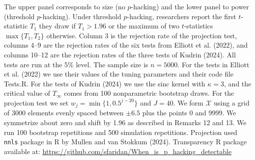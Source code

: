 \begin{table}[htbp]
\medskip
\begin{minipage}{\linewidth}
\footnotesize
The upper panel corresponds to size (no $p$-hacking) and the lower panel to power (threshold
$p$-hacking). Under threshold $p$-hacking, researchers report the first $t$-statistic $T_1$ they
draw if $T_1 > 1.96$ or the maximum of two $t$-statistics $\max\{T_1, T_2\}$ otherwise. Column 3 is
the rejection rate of the projection test, columns 4--9 are the rejection rates of the six tests
from Elliott et al. (2022), and columns 10--12 are the rejection rates of the three tests of Kudrin
(2024). All tests are run at the 5\% level. The sample size is $n = 5000$. For the tests in Elliott
et al. (2022) we use their values of the tuning parameters and their code file Tests.R. For the
tests of Kudrin (2024) we use the sinc kernel with $\kappa = 3$, and the critical value of
$T_{\infty}$ comes from 100 nonparametric bootstrap draws. For the projection test we set $w_j =
\min\{1, 0.5^{j - 20}\}$ and $J = 40$. We form $\mathcal{X}$ using a grid of 3000 elements evenly
spaced between $\pm 6.5$ plus the points 0 and 9999. We symmetrize about zero and shift by 1.96 as
described in Remarks 12 and 13. We run 100 bootstrap repetitions and 500 simulation repetitions.
Projection used \texttt{nnls} package in R by Mullen and van Stokkum (2024). Transparency R package
available at: \url{https://github.com/sfaridan/When_is_p_hacking_detectable}
\end{minipage}
\end{table}
